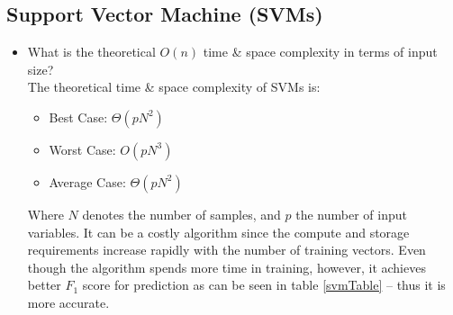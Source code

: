 \documentclass[twoside,openright,titlepage,numbers=noenddot,headinclude,%
               footinclude=true,cleardoublepage=empty,abstractoff,BCOR=5mm,%
               paper=a4,fontsize=11pt,ngerman,american]{scrreprt}
\numberwithin{theorem}{chapter}
\numberwithin{definition}{chapter}
\numberwithin{algorithm}{chapter}
\numberwithin{figure}{chapter}
\numberwithin{table}{chapter}
\numberwithin{equation}{chapter}
\begin{document}
\subsection*{Support Vector Machine (SVMs)}
\begin{itemize}
\item What is the theoretical $O(n)$ time \& space complexity in terms of input size?\\
The theoretical time \& space complexity of SVMs is:
\begin{itemize} 
\item Best Case: $\Theta(pN^2)$ 
\item Worst Case: $O(pN^3)$
\item Average Case: $\Theta(pN^2)$
\end{itemize}
Where $N$ denotes the number of samples, and $p$ the number of input variables. 
It can be a costly algorithm since the compute and storage requirements increase rapidly with the number of training vectors. Even though the algorithm spends more time in training, however, it achieves better $ F_1$ score for prediction as can be seen in table \ref{svmTable} – thus it is more accurate.


\end{itemize}
\end{document}
